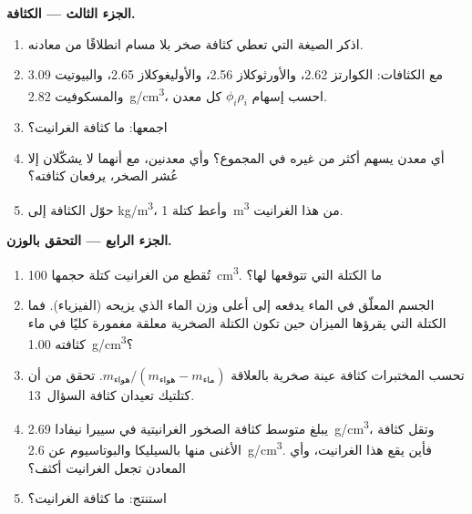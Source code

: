 \begin{problem}
\medskip
\noindent\textbf{الجزء الثالث --- الكثافة.}
\begin{enumerate}[resume]
  \item اذكر الصيغة التي تعطي كثافة صخر بلا مسام انطلاقًا من
        معادنه.
  \item مع الكثافات: الكوارتز \qty{2.62}{}، والأورثوكلاز \qty{2.56}{}،
        والأوليغوكلاز \qty{2.65}{}، والبيوتيت \qty{3.09}{} والمسكوفيت
        \qty{2.82}{g/cm^3}، احسب إسهام $\phi_i \rho_i$
        كل معدن.
  \item اجمعها: ما كثافة الغرانيت؟
  \item أي معدن يسهم أكثر من غيره في المجموع؟ وأي معدنين،
        مع أنهما لا يشكّلان إلا عُشر الصخر، يرفعان كثافته؟
  \item حوّل الكثافة إلى \unit{kg/m^3}، وأعط كتلة
        \qty{1}{m^3} من هذا الغرانيت.
\end{enumerate}

\medskip
\noindent\textbf{الجزء الرابع --- التحقق بالوزن.}
\begin{enumerate}[resume]
  \item تُقطع من الغرانيت كتلة حجمها \qty{100}{cm^3}. ما الكتلة التي
        تتوقعها لها؟
  \item الجسم المعلّق في الماء يدفعه إلى أعلى وزن الماء الذي
        يزيحه (الفيزياء). فما الكتلة التي يقرؤها الميزان حين تكون الكتلة الصخرية
        معلقة مغمورة كليًا في ماء كثافته \qty{1.00}{g/cm^3}؟
  \item تحسب المختبرات كثافة عينة صخرية بالعلاقة
        $m_{\text{هواء}}/(m_{\text{هواء}} - m_{\text{ماء}})$. تحقق من أن
        كتلتيك تعيدان كثافة السؤال~13.
  \item يبلغ متوسط كثافة الصخور الغرانيتية في سييرا نيفادا \qty{2.69}{g/cm^3}،
        وتقل كثافة الأغنى منها بالسيليكا والبوتاسيوم عن \qty{2.6}{g/cm^3}.
        فأين يقع هذا الغرانيت، وأي المعادن تجعل
        الغرانيت أكثف؟
  \item استنتج: ما كثافة الغرانيت؟
\end{enumerate}
\end{problem}
